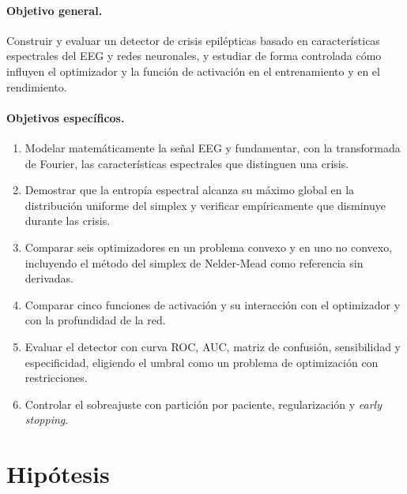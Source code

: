 \paragraph{Objetivo general.} Construir y evaluar un detector de crisis epilépticas basado en características espectrales del EEG y redes neuronales, y estudiar de forma controlada cómo influyen el optimizador y la función de activación en el entrenamiento y en el rendimiento.

\paragraph{Objetivos específicos.}
\begin{enumerate}
  \item Modelar matemáticamente la señal EEG y fundamentar, con la transformada de Fourier, las características espectrales que distinguen una crisis.
  \item Demostrar que la entropía espectral alcanza su máximo global en la distribución uniforme del simplex y verificar empíricamente que disminuye durante las crisis.
  \item Comparar seis optimizadores en un problema convexo y en uno no convexo, incluyendo el método del simplex de Nelder-Mead como referencia sin derivadas.
  \item Comparar cinco funciones de activación y su interacción con el optimizador y con la profundidad de la red.
  \item Evaluar el detector con curva ROC, AUC, matriz de confusión, sensibilidad y especificidad, eligiendo el umbral como un problema de optimización con restricciones.
  \item Controlar el sobreajuste con partición por paciente, regularización y \emph{early stopping}.
\end{enumerate}

\section{Hipótesis}
\label{sec:hipotesis}

